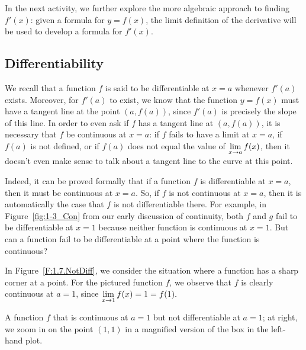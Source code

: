 

In the next activity, we further explore the more algebraic approach to finding $f'(x)$:  given a formula for $y = f(x)$, the limit definition of the derivative will be used to develop a formula for $f'(x)$.  


\subsection*{Differentiability}

We recall that a function $f$ is said to be differentiable at $x = a$ whenever $f'(a)$ exists.  Moreover, for $f'(a)$ to exist, we know that the function $y = f(x)$ must have a tangent line at the point $(a,f(a))$, since $f'(a)$ is precisely the slope of this line.  In order to even ask if $f$ has a tangent line at $(a,f(a))$, it is necessary that $f$ be continuous at $x = a$: if $f$ fails to have a limit at $x = a$, if $f(a)$ is not defined, or if $f(a)$ does not equal the value of $\displaystyle \lim_{x \to a} f(x)$, then it doesn't even make sense to talk about a tangent line to the curve at this point.

Indeed, it can be proved formally that if a function $f$ is differentiable at $x = a$, then it must be continuous at $x = a$.  So, if $f$ is not continuous at $x = a$, then it is automatically the case that $f$ is not differentiable there.  For example, in Figure~\ref{fig:1-3_Con} from our early discussion of continuity, both $f$ and $g$ fail to be differentiable at $x = 1$ because neither function is continuous at $x = 1$.  But can a function fail to be differentiable at a point where the function is continuous?

In Figure~\ref{F:1.7.NotDiff}, we consider the situation where a function has a sharp corner at a point.  For the pictured function $f$, we observe that $f$ is clearly continuous at $a = 1$, since $\displaystyle\lim_{x \to 1} f(x) = 1 = f(1).$

\begin{marginfigure} %
\caption{A function $f$ that is continuous at $a = 1$ but not differentiable at $a = 1$; at right, we zoom in on the point $(1,1)$ in a magnified version of the box in the left-hand plot.} \label{F:1.7.NotDiff}
\end{marginfigure}

